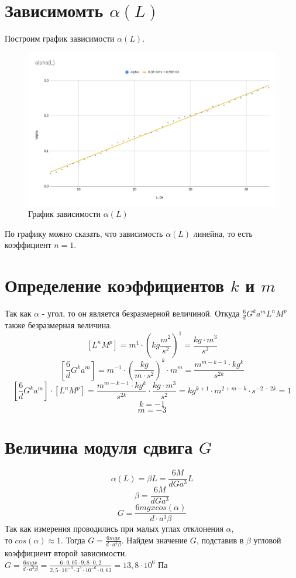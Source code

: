 \documentclass[12pt]{article}
\begin{document}
	\section{Зависимомть $\alpha(L)$}
	Построим график зависимости $\alpha(L)$.
	\begin{figure}[H]
		\centering
		\includegraphics[width=\linewidth]{graph2}
		\caption{График зависимости $\alpha(L)$}
	\end{figure}
	По графику можно сказать, что зависимость $\alpha(L)$ линейна, то есть коэффициент $n=1$.
	\section{Определение коэффициентов $k$ и $m$}
	Так как $\alpha$ - угол, то он является безразмерной величиной. Откуда $\displaystyle\frac{6}{d}G^ka^mL^nM^p$ также безразмерная величина.
	$$[L^nM^p] = m^1 \cdot (kg\frac{m^2}{s^2})^1=\frac{kg\cdot m^3}{s^2}$$
	$$\displaystyle[\frac{6}{d}G^ka^m]=m^{-1}\cdot (\frac{kg}{m\cdot s^2})^k\cdot m^m=\frac{m^{m-k-1}\cdot kg^k}{s^{2k}}$$
	$$\displaystyle[\frac{6}{d}G^ka^m]\cdot[L^nM^p]=\frac{m^{m-k-1}\cdot kg^k}{s^{2k}}\cdot\frac{kg\cdot m^3}{s^2}=kg^{k+1}\cdot m^{2+m-k}\cdot s^{-2-2k}=1$$
	$$k = -1$$
	$$m = -3$$
	\section{Величина модуля сдвига $G$}
	$$\alpha(L) = \beta L = \frac{6M}{dGa^3}L$$
	$$\beta=\frac{6M}{dGa^3}$$
	$$G = \frac{6mgxcos(\alpha)}{d\cdot a^3 \beta}$$
	Так как измерения проводились при малых углах отклонения $\alpha$, \\то $cos(\alpha)\approx 1$. Тогда $\displaystyle G = \frac{6mgx}{d\cdot a^3 \beta}$. Найдем значение $G$, подставив в $\beta$ угловой коэффициент второй зависимости.\\
	$\displaystyle G = \frac{6mgx}{d\cdot a^3 \beta} = \frac{6\cdot 0,05 \cdot 9,8\cdot0,2}{2,5\cdot 10^{-3}\cdot 3^3\cdot 10^{-6}\cdot 0,63}=13,8\cdot 10^6$ Па	
\end{document}
